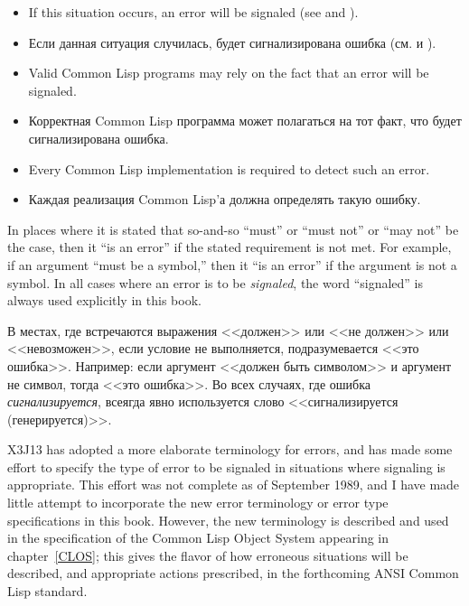 \begin{itemize}
\item If this situation occurs, an error will be signaled
(see  and ).

\item Если данная ситуация случилась, будет сигнализирована ошибка
(см.  и ).

\item Valid Common Lisp programs may rely on the fact that an error will be
signaled.

\item Корректная Common Lisp программа может полагаться на тот факт, что будет
сигнализирована ошибка.

\item Every Common Lisp implementation is required to detect such an error.

\item Каждая реализация Common Lisp'а должна определять такую ошибку.
\end{itemize}

In places where it is stated that so-and-so ``must'' or ``must not''
or ``may not''  be the case, then it ``is an error'' if the stated requirement
is not met.  For example, if an argument ``must be a symbol,'' then it
``is an error'' if the argument is not a symbol.  In all cases where
an error is to be \textit{signaled}, the word ``signaled'' is always used
explicitly in this book.

В местах, где встречаются выражения <<должен>> или <<не должен>> или
<<невозможен>>, если условие не
выполняется, подразумевается <<это ошибка>>. Например: если аргумент <<должен
быть символом>> и аргумент не символ, тогда <<это
ошибка>>. Во всех случаях, где ошибка {\it
сигнализируется}, всеягда явно используется слово <<сигнализируется (генерируется)>>.

\begin{newer}
X3J13 has adopted a more elaborate terminology for errors,
and has made some effort to specify the type of error to be signaled
in situations where signaling is appropriate.  This effort
was not complete as of September 1989, and I have made little
attempt to incorporate the new error terminology or
error type specifications in this book.  However, the new terminology
is described and used in the specification of the
Common Lisp Object System appearing in chapter~\ref{CLOS}; this gives
the flavor of how erroneous situations will be described,
and appropriate actions prescribed, in the forthcoming ANSI Common
Lisp standard.
\end{newer}


